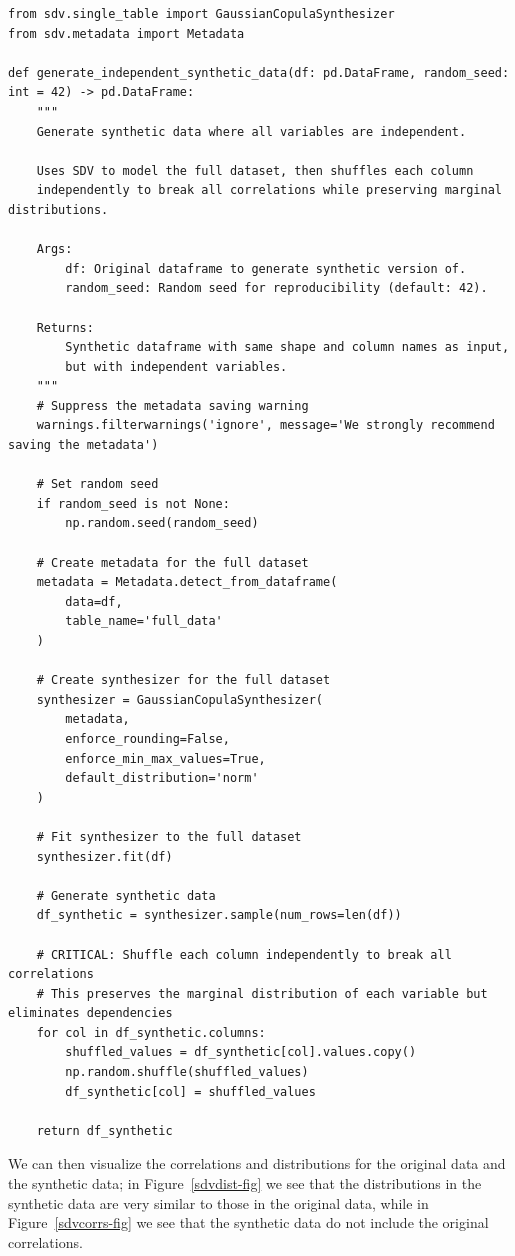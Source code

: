\begin{lstlisting}[style=Python]
from sdv.single_table import GaussianCopulaSynthesizer
from sdv.metadata import Metadata

def generate_independent_synthetic_data(df: pd.DataFrame, random_seed: int = 42) -> pd.DataFrame:
    """
    Generate synthetic data where all variables are independent.
    
    Uses SDV to model the full dataset, then shuffles each column 
    independently to break all correlations while preserving marginal distributions.
    
    Args:
        df: Original dataframe to generate synthetic version of.
        random_seed: Random seed for reproducibility (default: 42).
        
    Returns:
        Synthetic dataframe with same shape and column names as input,
        but with independent variables.
    """
    # Suppress the metadata saving warning
    warnings.filterwarnings('ignore', message='We strongly recommend saving the metadata')
    
    # Set random seed
    if random_seed is not None:
        np.random.seed(random_seed)
    
    # Create metadata for the full dataset
    metadata = Metadata.detect_from_dataframe(
        data=df,
        table_name='full_data'
    )
    
    # Create synthesizer for the full dataset
    synthesizer = GaussianCopulaSynthesizer(
        metadata,
        enforce_rounding=False,
        enforce_min_max_values=True,
        default_distribution='norm'
    )
    
    # Fit synthesizer to the full dataset
    synthesizer.fit(df)
    
    # Generate synthetic data
    df_synthetic = synthesizer.sample(num_rows=len(df))
    
    # CRITICAL: Shuffle each column independently to break all correlations
    # This preserves the marginal distribution of each variable but eliminates dependencies
    for col in df_synthetic.columns:
        shuffled_values = df_synthetic[col].values.copy()
        np.random.shuffle(shuffled_values)
        df_synthetic[col] = shuffled_values
    
    return df_synthetic
\end{lstlisting}

We can then visualize the correlations and distributions for the original data and the synthetic data; in Figure~\ref{sdvdist-fig} we see that the distributions in the synthetic data are very similar to those in the original data, while in Figure~\ref{sdvcorrs-fig} we see that the synthetic data do not include the original correlations.

